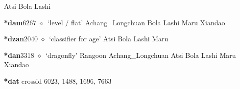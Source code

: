 \begin{list}{}{\leftmargin=1.5em \itemindent=-1.5em}
         Atsi 
\hspace{1ex}
         Bola 
\hspace{1ex}
         Lashi 
  \item {\footnotesize \textbf{*dam}}{\tiny 6267}
\hspace{1ex}
         $\diamond$~`level / flat'
         Achang\_Longchuan 
\hspace{1ex}
         Bola 
\hspace{1ex}
         Lashi 
\hspace{1ex}
         Maru 
\hspace{1ex}
         Xiandao 
  \item {\footnotesize \textbf{*dzan}}{\tiny 2040}
\hspace{1ex}
         $\diamond$~`classifier for age'
         Atsi 
\hspace{1ex}
         Bola 
\hspace{1ex}
         Lashi 
\hspace{1ex}
         Maru 
  \item {\footnotesize \textbf{*dan}}{\tiny 3318}
\hspace{1ex}
         $\diamond$~`dragonfly'
         Rangoon 
\hspace{1ex}
         Achang\_Longchuan 
\hspace{1ex}
         Atsi 
\hspace{1ex}
         Bola 
\hspace{1ex}
         Lashi 
\hspace{1ex}
         Maru 
\hspace{1ex}
         Xiandao 
  \end{list}
\item
\textbf{*dat}
  {\tiny crossid 6023, 1488, 1696, 7663}
